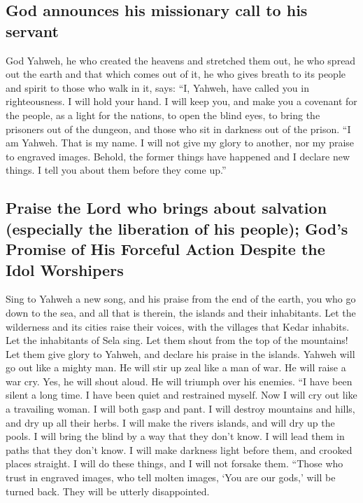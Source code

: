 \hypertarget{god-announces-his-missionary-call-to-his-servant}{%
\subsection{God announces his missionary call to his
servant}\label{god-announces-his-missionary-call-to-his-servant}}

 God Yahweh, he who created the heavens and stretched them
out, he who spread out the earth and that which comes out of it, he who
gives breath to its people and spirit to those who walk in it, says:
 ``I, Yahweh, have called you in righteousness. I will
hold your hand. I will keep you, and make you a covenant for the people,
as a light for the nations,  to open the blind eyes, to
bring the prisoners out of the dungeon, and those who sit in darkness
out of the prison.  ``I am Yahweh. That is my name. I will
not give my glory to another, nor my praise to engraved images.
 Behold, the former things have happened and I declare new
things. I tell you about them before they come up.''

\hypertarget{praise-the-lord-who-brings-about-salvation-especially-the-liberation-of-his-people-gods-promise-of-his-forceful-action-despite-the-idol-worshipers}{%
\subsection{Praise the Lord who brings about salvation (especially the
liberation of his people); God's Promise of His Forceful Action Despite
the Idol
Worshipers}\label{praise-the-lord-who-brings-about-salvation-especially-the-liberation-of-his-people-gods-promise-of-his-forceful-action-despite-the-idol-worshipers}}

 Sing to Yahweh a new song, and his praise from the end
of the earth, you who go down to the sea, and all that is therein, the
islands and their inhabitants.  Let the wilderness and
its cities raise their voices, with the villages that Kedar inhabits.
Let the inhabitants of Sela sing. Let them shout from the top of the
mountains!  Let them give glory to Yahweh, and declare
his praise in the islands.  Yahweh will go out like a
mighty man. He will stir up zeal like a man of war. He will raise a war
cry. Yes, he will shout aloud. He will triumph over his enemies.
 ``I have been silent a long time. I have been quiet and
restrained myself. Now I will cry out like a travailing woman. I will
both gasp and pant.  I will destroy mountains and hills,
and dry up all their herbs. I will make the rivers islands, and will dry
up the pools.  I will bring the blind by a way that they
don't know. I will lead them in paths that they don't know. I will make
darkness light before them, and crooked places straight. I will do these
things, and I will not forsake them.  ``Those who trust
in engraved images, who tell molten images, `You are our gods,' will be
turned back. They will be utterly disappointed.

